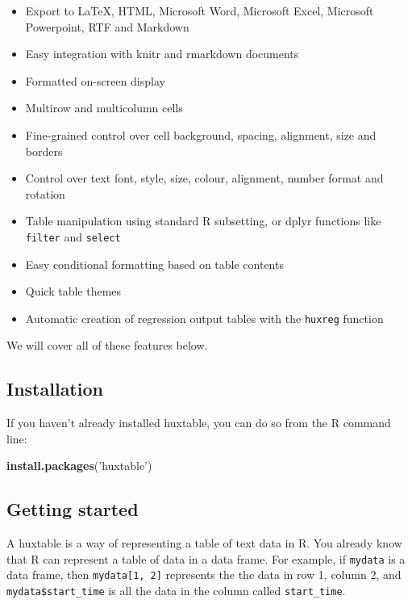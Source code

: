 \documentclass[]{article}
\newenvironment{Shaded}{\begin{snugshade}}{\end{snugshade}}
\newcommand{\KeywordTok}[1]{\textcolor[rgb]{0.13,0.29,0.53}{\textbf{#1}}}
\newcommand{\NormalTok}[1]{#1}
\newcommand{\StringTok}[1]{\textcolor[rgb]{0.31,0.60,0.02}{#1}}
\providecommand{\tightlist}{%
  \setlength{\itemsep}{0pt}\setlength{\parskip}{0pt}}
\begin{document}
\begin{itemize}
\tightlist
\item
  Export to LaTeX, HTML, Microsoft Word, Microsoft Excel, Microsoft
  Powerpoint, RTF and Markdown
\item
  Easy integration with knitr and rmarkdown documents
\item
  Formatted on-screen display
\item
  Multirow and multicolumn cells
\item
  Fine-grained control over cell background, spacing, alignment, size
  and borders
\item
  Control over text font, style, size, colour, alignment, number format
  and rotation
\item
  Table manipulation using standard R subsetting, or dplyr functions
  like \texttt{filter} and \texttt{select}
\item
  Easy conditional formatting based on table contents
\item
  Quick table themes
\item
  Automatic creation of regression output tables with the
  \texttt{huxreg} function
\end{itemize}

We will cover all of these features below.

\hypertarget{installation}{%
\subsection{Installation}\label{installation}}

If you haven't already installed huxtable, you can do so from the R
command line:

\begin{Shaded}
\begin{Highlighting}[]
\KeywordTok{install.packages}\NormalTok{(}\StringTok{'huxtable'}\NormalTok{)}
\end{Highlighting}
\end{Shaded}

\FloatBarrier

\hypertarget{getting-started}{%
\subsection{Getting started}\label{getting-started}}

A huxtable is a way of representing a table of text data in R. You
already know that R can represent a table of data in a data frame. For
example, if \texttt{mydata} is a data frame, then
\texttt{mydata{[}1,\ 2{]}} represents the the data in row 1, column 2,
and \texttt{mydata\$start\_time} is all the data in the column called
\texttt{start\_time}.
\end{document}
